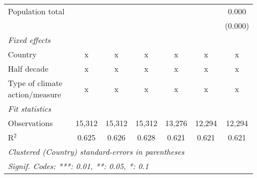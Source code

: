\begin{tabular}{lcccccc}
   Population total                                              &              &              &               &               &               & 0.000\\   
                                                                 &              &              &               &               &               & (0.000)\\   
   \emph{Fixed effects}\\
   Country                                                       & x            & x            & x             & x             & x             & x\\  
   Half decade                                                   & x            & x            & x             & x             & x             & x\\  
   Type of climate action/measure                                & x            & x            & x             & x             & x             & x\\  
   \midrule \emph{Fit statistics}\\
   Observations                                                  & 15,312       & 15,312       & 15,312        & 13,276        & 12,294        & 12,294\\  
   R$^2$                                                         & 0.625        & 0.626        & 0.628         & 0.621         & 0.621         & 0.621\\  
   \midrule
   \multicolumn{7}{l}{\emph{Clustered (Country) standard-errors in parentheses}}\\
   \multicolumn{7}{l}{\emph{Signif. Codes: ***: 0.01, **: 0.05, *: 0.1}}\\
\end{tabular}
\par\endgroup


